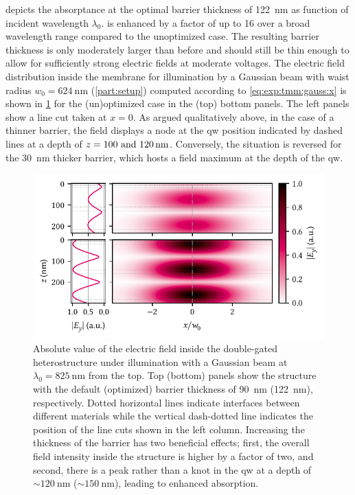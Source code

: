  depicts the absorptance at the optimal barrier thickness of \qty{122}{\nano\meter} as function of incident wavelength $\lambda_0$.
\absorptance is enhanced by a factor of up to \num{16} over a broad wavelength range compared to the unoptimized case.
The resulting barrier thickness is only moderately larger than before and should still be thin enough to allow for sufficiently strong electric fields at moderate voltages.
The electric field distribution inside the membrane for illumination by a Gaussian beam with waist radius $w_0 = \qty{624}{\nano\meter}$ (\cref{part:setup}) computed according to \cref{eq:exp:tmm:gauss:x} is shown in \cref{fig:exp:tmm:field} for the (un)optimized case in the (top) bottom panels.
The left panels show a line cut taken at $x=0$.
As argued qualitatively above, in the case of a thinner barrier, the field displays a node at the \gls{qw} position indicated by dashed lines at a depth of $z=\qtylist[list-units = single]{100;120}{\nano\meter}$.
Conversely, the situation is reversed for the \qty{30}{\nano\meter} thicker barrier, which hosts a field maximum at the depth of the \gls{qw}.

\begin{figure}
    \centering
    \includegraphics{img/pdf/experiment/tmm_field}
    \caption[]{
        Absolute value of the electric field inside the double-gated heterostructure under illumination with a Gaussian beam at $\lambda_0=\qty{825}{\nano\meter}$ from the top.
        Top (bottom) panels show the structure with the default (optimized) barrier thickness of \qty{90}{\nano\meter} (\qty{122}{\nano\meter}), respectively.
        Dotted horizontal lines indicate interfaces between different materials while the vertical dash-dotted line indicates the position of the line cuts shown in the left column.
        Increasing the thickness of the barrier has two beneficial effects; first, the overall field intensity inside the structure is higher by a factor of two, and second, there is a peak rather than a knot in the \gls{qw} at a depth of $\sim\qty{120}{\nano\meter}$ ($\sim\qty{150}{\nano\meter}$), leading to enhanced absorption.
    }
    \label{fig:exp:tmm:field}
\end{figure}

